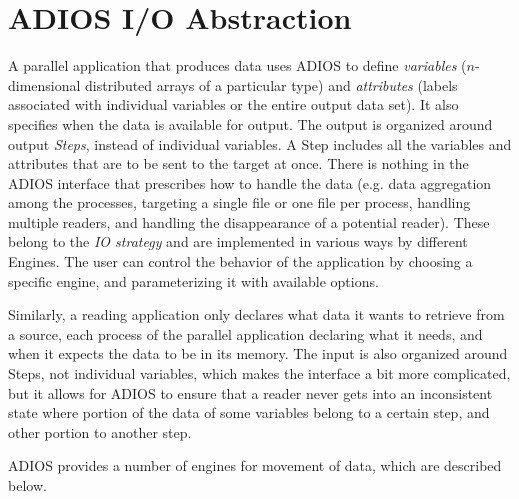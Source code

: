 \section{ADIOS I/O Abstraction}
\label{sec:adios}

A parallel application that produces data uses ADIOS to define \emph{variables} ($n$-dimensional distributed arrays of a particular type) and \emph{attributes} (labels associated with individual variables or the entire output data set).
It also specifies when the data is available for output. The output is organized around output \emph{Steps}, instead of individual variables.
A Step includes all the variables and attributes that are to be sent to the target at once.
There is nothing in the ADIOS interface that prescribes how to handle the data (e.g. data aggregation among the processes, targeting a single file or one file per process, handling multiple readers, and handling the disappearance of a potential reader).
These belong to the \emph{IO strategy} and are implemented in various ways by different Engines.
The user can control the behavior of the application by choosing a specific engine, and parameterizing it with available options. 

Similarly, a reading application only declares what data it wants to retrieve from a source, each process of the parallel application declaring what it needs, and when it expects the data to be in its memory.
The input is also organized around Steps, not individual variables, which makes the interface a bit more complicated, but it allows for ADIOS to ensure that a reader never gets into an inconsistent state where portion of the data of some variables belong to a certain step, and other portion to another step. 

ADIOS provides a number of engines for movement of data, which are described below.

